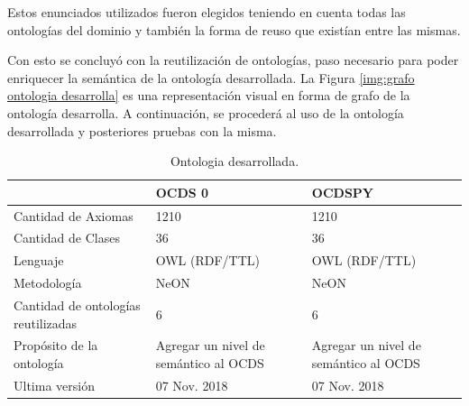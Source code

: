 Estos enunciados utilizados fueron elegidos teniendo en cuenta todas las ontologías del dominio y también la forma de reuso que existían entre las mismas. 

Con esto se concluyó con la reutilización de ontologías, paso necesario para poder enriquecer la semántica de la ontología desarrollada. La Figura \ref{img:grafo ontologia desarrolla} es una representación visual en forma de grafo de la ontología desarrolla. A continuación, se procederá al uso de la ontología desarrollada y posteriores pruebas con la misma.


\begin{table}[!htb]
    \caption{Ontologia desarrollada.}
    \label{tab:comparacion_ontologias}
    
    \scriptsize 
    \begin{tabular}{|L{6cm}|C{2.5cm}|C{2.5cm}}
    \hline
     &  OCDS 0  & OCDSPY \\
    \hline

    
    Cantidad de Axiomas & 1210 & 1210 \\
    \hline

    Cantidad de Clases & 36 & 36 \\
    \hline

    Lenguaje & OWL (RDF/TTL) & OWL (RDF/TTL) \\
    \hline
    Metodología & NeON & NeON \\
     \hline
    Cantidad de ontologías reutilizadas & 6 & 6\\
    \hline
    Propósito de la ontología & Agregar un nivel de semántico al OCDS  & Agregar un nivel de semántico al OCDS \\
    \hline
    Ultima versión & 07 Nov. 2018 & 07 Nov. 2018 \\
    \hline
    \end{tabular}
    
    \bigskip
   
    \end{table}

